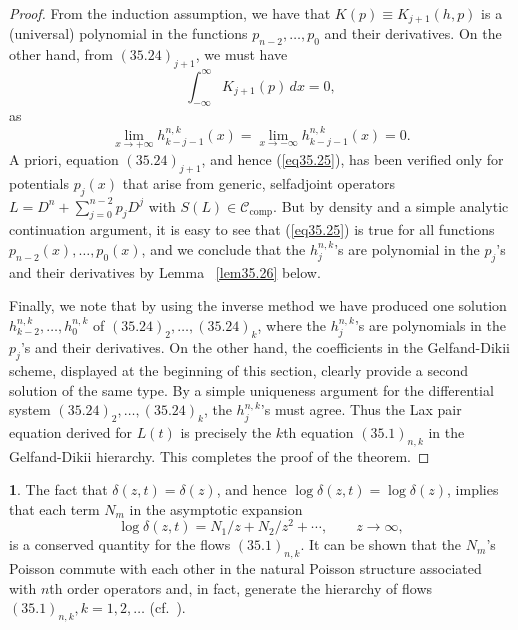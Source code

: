\documentclass{surv-l}
\theoremstyle{plain}
\theoremstyle{definition}
\newtheorem*{rem}{\sc{Remark}}
\numberwithin{equation}{chapter}
\begin{document}
\begin{proof}
From the induction assumption, we have that $K(p)\equiv K_{j+1}(h,p)$ is a (universal) polynomial in the functions $p_{n-2},\ldots,p_{0}$ and their derivatives. On the other hand, from $(35.24)_{j+1}$, we must have
\setcounter{equation}{24}
\begin{equation}\label{eq35.25}
\int_{-\infty}^{\infty}K_{j+1}(p)\,dx=0,
\end{equation}
as
\begin{equation*}
\lim_{x\rightarrow+\infty}h_{k-j-1}^{n,k}(x)=\lim_{x\rightarrow-\infty}h_{k-j-1}^{n,k}(x)=0.
\end{equation*}
A priori, equation $(35.24)_{j+1}$, and hence (\ref{eq35.25}), has been verified only for potentials $p_{j}(x)$ that arise from generic, selfadjoint operators $L=D^{n}+\sum_{j=0}^{n-2}p_{j}D^{j}$ with $S(L)\in \mathscr{C}_{\mathrm{comp}}$. But by density and a simple analytic continuation argument, it is easy to see that (\ref{eq35.25}) is true for all functions $p_{n-2}(x),\ldots,p_{0}(x)$, and we conclude that the $h_{j}^{n,k}$'s are polynomial in the $p_{j}$'s and their derivatives by Lemma ~\ref{lem35.26} below.

Finally, we note that by using the inverse method we have produced one solution $h_{k-2}^{n,k},\ldots,  h_{0}^{n,k}$ of $(35.24)_{2},\ldots,(35.24)_{k}$, where the $h_{j}^{n,k}$'s are polynomials in the $p_{j}$'s and their derivatives. On the other hand, the coefficients in the Gelfand-Dikii scheme, displayed at the beginning of this section, clearly provide a second solution of the same type. By a simple uniqueness argument for the differential system $(35.24)_{2},\ldots,(35.24)_{k}$, the $h_{j}^{n,k}$'s must agree. Thus the Lax pair equation derived for $L(t)$ is precisely the $k$th equation $(35.1)_{n,k}$ in the Gelfand-Dikii hierarchy. This completes the proof of the theorem.\quad
\end{proof}
\begin{rem}
The fact that $\delta(z, t)=\delta(z)$, and hence $\log\delta(z, t)=\log\delta(z)$, implies that each term $N_{m}$ in the asymptotic expansion
\begin{equation*}
\log\delta(z,t)=N_{1}/z+N_{2}/z^{2}+\cdots,\qquad z\rightarrow\infty,
\end{equation*}
is a conserved quantity for the flows $(35.1)_{n,k}$. It can be shown that the $N_{m}$'s Poisson commute with each other in the natural Poisson structure associated with $n$th order operators and, in fact, generate the hierarchy of flows $(35.1)_{n,k},k=1,2,\ldots$ (cf.~\cite{GD}).
\end{rem}
\end{document}
